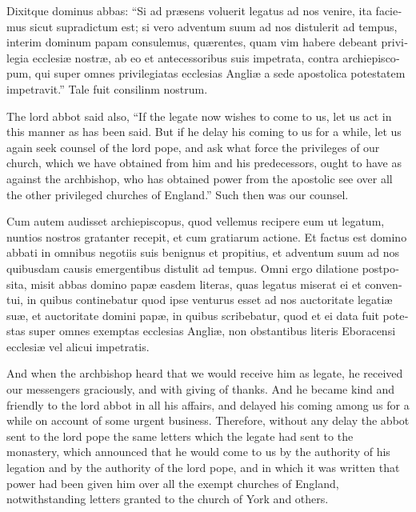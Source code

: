 \documentclass{book}
\begin{document}
\begin{paracol}{2}
\switchcolumn*

\begin{otherlanguage}{latin}
Dixitque dominus abbas: ``Si ad pr\ae{}sens voluerit legatus ad nos venire, ita faciemus sicut supradictum est; si vero adventum suum ad nos distulerit ad tempus, interim dominum papam consulemus, qu\ae{}rentes, quam vim habere debeant privilegia ecclesi\ae{} nostr\ae{}, ab eo et antecessoribus suis impetrata, contra archiepiscopum, qui super omnes privilegiatas ecclesias Angli\ae{} a sede apostolica potestatem impetravit.'' Tale fuit consilinm nostrum.
\end{otherlanguage}

\switchcolumn

The lord abbot said also, ``If the legate now wishes to come to us, let us act in this manner as has been said. But if he delay his coming to us for a while, let us again seek counsel of the lord pope, and ask what force the privileges of our church, which we have obtained from him and his predecessors, ought to have as against the archbishop, who has obtained power from the apostolic see over all the other privileged churches of England.'' Such then was our counsel.

\switchcolumn*

\begin{otherlanguage}{latin}
Cum autem audisset archiepiscopus, quod vellemus recipere eum ut legatum, nuntios nostros gratanter recepit, et cum gratiarum actione. Et factus est domino abbati in omnibus negotiis suis benignus et propitius, et adventum suum ad nos quibusdam causis emergentibus distulit ad tempus. Omni ergo dilatione postposita, misit abbas domino pap\ae{} easdem literas, quas legatus miserat ei et conventui, in quibus continebatur quod ipse venturus esset ad nos auctoritate legati\ae{} su\ae{}, et auctoritate domini pap\ae{}, in quibus scribebatur, quod et ei data fuit potestas super omnes exemptas ecclesias Angli\ae{}, non obstantibus literis Eboracensi ecclesi\ae{} vel alicui impetratis. 
\end{otherlanguage}

\switchcolumn

And when the archbishop heard that we would receive him as legate, he received our messengers graciously, and with giving of thanks. And he became kind and friendly to the lord abbot in all his affairs, and delayed his coming among us for a while on account of some urgent business. Therefore, without any delay the abbot sent to the lord pope the same letters which the legate had sent to the monastery, which announced that he would come to us by the authority of his legation and by the authority of the lord pope, and in which it was written that power had been given him over all the exempt churches of England, notwithstanding letters granted to the church of York and others.


\end{paracol}
\end{document}
